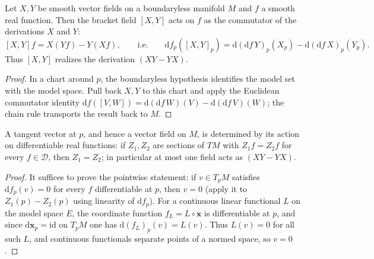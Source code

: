 \begin{lemma}
  \label{lem:dc-ch0-5-2-commutator}


  Let $X,Y$ be smooth vector fields on a boundaryless manifold $M$ and $f$ a smooth
  real function. Then the bracket field $[X,Y]$ acts on $f$ as the
  commutator of the derivations $X$ and $Y$:
  $$
  [X,Y]f = X(Yf)-Y(Xf), \qquad\text{i.e.}\qquad
  \mathrm{d}f_p([X,Y]_p) = \mathrm{d}(\mathrm{d}f\,Y)_p(X_p)-\mathrm{d}(\mathrm{d}f\,X)_p(Y_p).
  $$
  Thus $[X,Y]$ realizes the derivation $(XY-YX)$.
\end{lemma}
\begin{proof}
  \sketch

  In a chart around $p$, the boundaryless hypothesis identifies the model set with the
  model space. Pull back $X,Y$ to this chart and apply the Euclidean commutator identity
  $\mathrm{d}f([V,W])=\mathrm{d}(\mathrm{d}f\,W)(V)-\mathrm{d}(\mathrm{d}f\,V)(W)$;
  the chain rule transports the result back to $M$.
\end{proof}

\begin{lemma}
  \label{lem:dc-ch0-5-2-unique}


  A tangent vector at $p$, and hence a vector field on $M$, is determined by its
  action on differentiable real functions: if $Z_1,Z_2$ are sections of $TM$ with
  $Z_1f=Z_2f$ for every $f\in\mathcal{D}$, then $Z_1=Z_2$; in particular at most one
  field acts as $(XY-YX)$.
\end{lemma}
\begin{proof}
  \sketch

  It suffices to prove the pointwise statement: if $v\in T_pM$ satisfies
  $\mathrm{d}f_p(v)=0$ for every $f$ differentiable at $p$, then $v=0$
  (apply it to $Z_1(p)-Z_2(p)$ using linearity of $\mathrm{d}f_p$). For a
  continuous linear functional $L$ on the model space $E$, the coordinate function
  $f_L=L\circ\mathbf{x}$
  is differentiable at $p$, and since $\mathrm{d}\mathbf{x}_p=\mathrm{id}$ on
  $T_pM$ one has $\mathrm{d}(f_L)_p(v)=L(v)$. Thus $L(v)=0$ for all such $L$, and
  continuous functionals separate points of a normed space, so $v=0$.
\end{proof}

